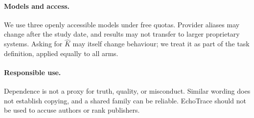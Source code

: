 \documentclass[11pt]{article}
\begin{document}
\paragraph{Models and access.}
We use three openly accessible models under free quotas. Provider aliases may change after the
study date, and results may not transfer to larger proprietary systems. Asking for $\widehat K$ may
itself change behaviour; we treat it as part of the task definition, applied equally to all arms.

\paragraph{Responsible use.}
Dependence is not a proxy for truth, quality, or misconduct. Similar wording does not establish
copying, and a shared family can be reliable. EchoTrace should not be used to accuse authors or rank
publishers.


\end{document}
